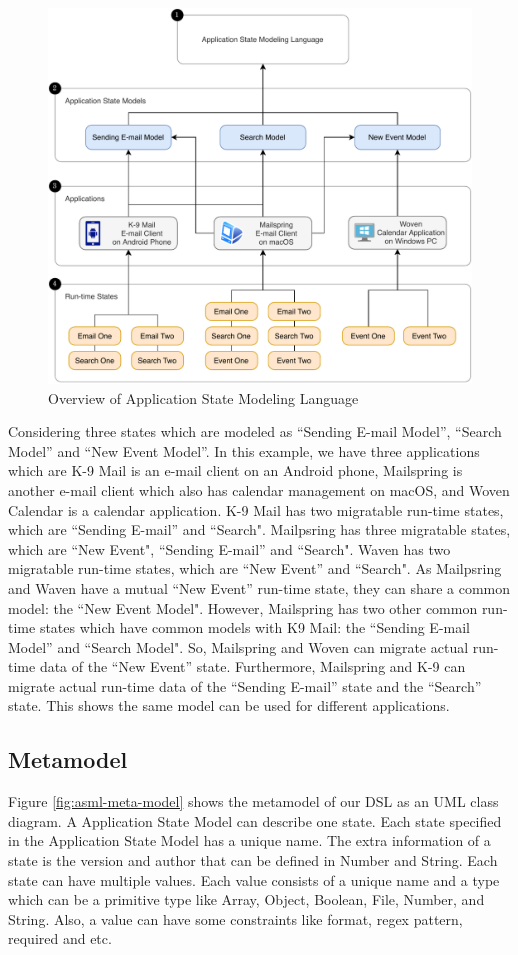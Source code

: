 \FloatBarrier
\begin{figure}
    \includegraphics[scale=0.8]{../figures/asml-overview}
    \centering
    \caption{Overview of Application State Modeling Language}
    \label{fig:asml-overview}
\end{figure}
\FloatBarrier

Considering three states which are modeled as “Sending E-mail Model”, “Search Model” and “New Event Model”. In this example, we have three applications which are K-9 Mail is an e-mail client on an Android phone, Mailspring is another e-mail client which also has calendar management on macOS, and Woven Calendar is a calendar application. K-9 Mail has two migratable run-time states, which are “Sending E-mail” and “Search". Mailpsring has three migratable states, which are “New Event", “Sending E-mail” and “Search". Waven has two migratable run-time states, which are “New Event” and “Search". As Mailpsring and Waven have a mutual “New Event” run-time state, they can share a common model: the “New Event Model". However, Mailspring has two other common run-time states which have common models with K9 Mail: the “Sending E-mail Model” and “Search Model". So, Mailspring and Woven can migrate actual run-time data of the “New Event” state. Furthermore, Mailspring and K-9 can migrate actual run-time data of the “Sending E-mail” state and the “Search” state. This shows the same model can be used for different applications.

\subsection{Metamodel}
Figure \ref{fig:asml-meta-model} shows the metamodel of our DSL as an UML class diagram. A Application State Model can describe one state. Each state specified in the Application State Model has a unique name. The extra information of a state is the version and author that can be defined in Number and String. Each state can have multiple values. Each value consists of a unique name and a type which can be a primitive type like Array, Object, Boolean, File, Number, and String. Also, a value can have some constraints like format, regex pattern, required and etc.

